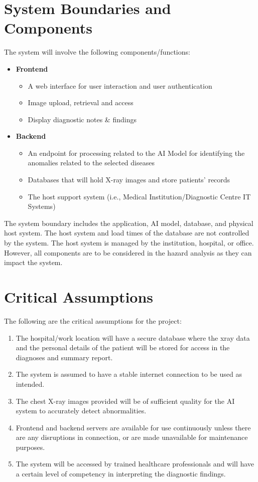 \documentclass{article}
\begin{document}
\section{System Boundaries and Components}
The system will involve the following components/functions: 
\begin{itemize}
    \item \textbf{Frontend}
    \begin{itemize}
        \item A web interface for user interaction and user authentication
        \item Image upload, retrieval and access
        \item Display diagnostic notes \& findings
    \end{itemize}
    \item \textbf{Backend}
    \begin{itemize}
        \item An endpoint for processing related to the AI Model for identifying the anomalies related to the selected diseases
        \item Databases that will hold X-ray images and store patients' records
        \item The host support system (i.e., Medical Institution/Diagnostic Centre IT Systems)
    \end{itemize}
\end{itemize}

\noindent The system boundary includes the application, AI model, database, and physical host system. The host system and load times of the database are not controlled by the system. The host system is managed by the institution, hospital, or office. However, all components are to be considered in the hazard analysis as they can impact the system.

\section{Critical Assumptions}
The following are the critical assumptions for the project:
\begin{enumerate}
    \item The hospital/work location will have a secure database where the xray data and the personal details of the patient will be stored for access in the diagnoses and summary report.
    \item The system is assumed to have a stable internet connection to be used as intended.
    \item The chest X-ray images provided will be of sufficient quality for the AI system to accurately detect abnormalities.
    \item  Frontend and backend servers are available for use continuously unless there are any disruptions in connection, or are made unavailable for maintenance purposes.
    \item  The system will be accessed by trained healthcare professionals and will have a certain level of competency in interpreting the diagnostic findings.
\end{enumerate}
\end{document}

